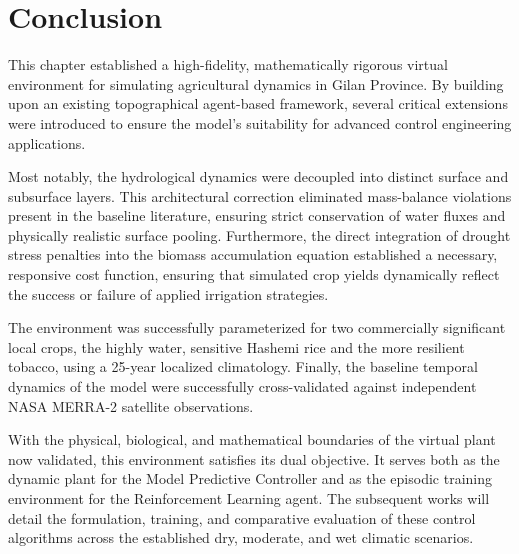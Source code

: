 \section{Conclusion}
\label{sec:conclusion}

This chapter established a high-fidelity, mathematically rigorous virtual environment for simulating agricultural dynamics in Gilan Province. By building upon an existing topographical agent-based framework, several critical extensions were introduced to ensure the model's suitability for advanced control engineering applications. 

Most notably, the hydrological dynamics were decoupled into distinct surface and subsurface layers. This architectural correction eliminated mass-balance violations present in the baseline literature, ensuring strict conservation of water fluxes and physically realistic surface pooling. Furthermore, the direct integration of drought stress penalties into the biomass accumulation equation established a necessary, responsive cost function, ensuring that simulated crop yields dynamically reflect the success or failure of applied irrigation strategies.

The environment was successfully parameterized for two commercially significant local crops, the highly water, sensitive Hashemi rice and the more resilient tobacco, using a 25-year localized climatology. Finally, the baseline temporal dynamics of the model were successfully cross-validated against independent NASA MERRA-2 satellite observations.

With the physical, biological, and mathematical boundaries of the virtual plant now validated, this environment satisfies its dual objective. It serves both as the dynamic plant for the Model Predictive Controller and as the episodic training environment for the Reinforcement Learning agent. The subsequent works will detail the formulation, training, and comparative evaluation of these control algorithms across the established dry, moderate, and wet climatic scenarios.